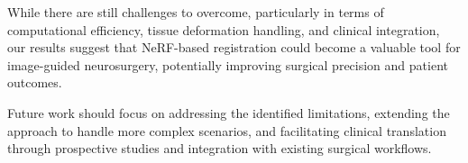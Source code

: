 While there are still challenges to overcome, particularly in terms of computational efficiency, tissue deformation handling, and clinical integration, our results suggest that NeRF-based registration could become a valuable tool for image-guided neurosurgery, potentially improving surgical precision and patient outcomes.

Future work should focus on addressing the identified limitations, extending the approach to handle more complex scenarios, and facilitating clinical translation through prospective studies and integration with existing surgical workflows. 